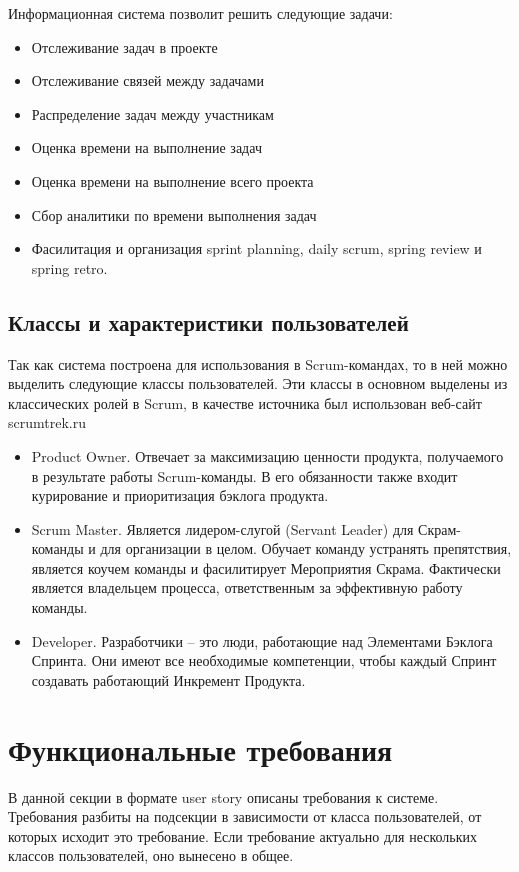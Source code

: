 \documentclass{article}
\begin{document}
Информационная система позволит решить следующие задачи:
\begin{itemize}
	\item Отслеживание задач в проекте
	\item Отслеживание связей между задачами
	\item Распределение задач между участникам
	\item Оценка времени на выполнение задач
	\item Оценка времени на выполнение всего проекта
	\item Сбор аналитики по времени выполнения задач
	\item Фасилитация и организация sprint planning, daily scrum, spring review и spring retro.
\end{itemize}

\subsection{Классы и характеристики пользователей}
Так как система построена для использования в Scrum-командах, то в ней
можно выделить следующие классы пользователей. Эти классы в основном выделены из
классических ролей в Scrum, в качестве источника был использован веб-сайт scrumtrek.ru
\begin{itemize}
	\item Product Owner. Отвечает за максимизацию ценности продукта, получаемого в результате работы Scrum-команды.
	      В его обязанности также входит курирование и приоритизация бэклога продукта.
	\item Scrum Master. Является лидером-слугой (Servant Leader) для Скрам-команды и для организации в целом.
	      Обучает команду устранять препятствия, является коучем команды и фасилитирует Мероприятия Скрама.
	      Фактически является владельцем процесса, ответственным за эффективную работу команды.
	\item Developer. Разработчики -- это люди, работающие над Элементами Бэклога Спринта.
	      Они имеют все необходимые компетенции, чтобы каждый Спринт создавать работающий Инкремент Продукта.
\end{itemize}

\section{Функциональные требования}

В данной секции в формате user story описаны требования к системе.
Требования разбиты на подсекции в зависимости от класса пользователей,
от которых исходит это требование.
Если требование актуально для нескольких классов пользователей, оно
вынесено в общее.
\end{document}

